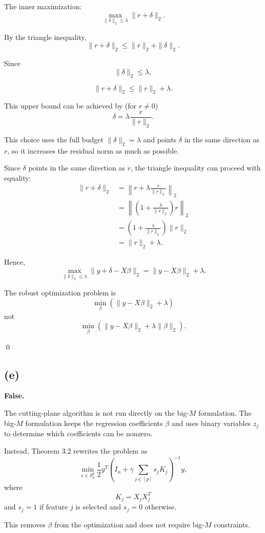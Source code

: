 \documentclass{article}
\begin{document}
The inner maximization: 
\[
\max_{\|\delta\|_2\leq\lambda}\|r+\delta\|_2.
\]

By the triangle inequality,
\[
\|r+\delta\|_2
\leq
\|r\|_2+\|\delta\|_2.
\]

Since
\[
\|\delta\|_2\leq\lambda,
\]

\[
\|r+\delta\|_2
\leq
\|r\|_2+\lambda.
\]

This upper bound can be achieved by (for $r\neq 0$)
\[
\delta
=
\lambda\frac{r}{\|r\|_2}.
\]

This choice uses the full budget $\|\delta\|_2=\lambda$ and points $\delta$ in the same direction as $r$, so it increases the residual norm as much as possible.

Since $\delta$ points in the same direction as $r$, the triangle
inequality can proceed with equality: 
\[
\begin{aligned}
\|r+\delta\|_2
&=
\left\|
r+\lambda\frac{r}{\|r\|_2}
\right\|_2 \\
&=
\left\|
\left(1+\frac{\lambda}{\|r\|_2}\right)r
\right\|_2 \\
&=
\left(1+\frac{\lambda}{\|r\|_2}\right)\|r\|_2 \\
&=
\|r\|_2+\lambda.
\end{aligned}
\]


Hence,
\[
\max_{\|\delta\|_2\leq\lambda}
\|y+\delta-X\beta\|_2
=
\|y-X\beta\|_2+\lambda.
\]

The robust optimization problem is
\[
\boxed{
\min_\beta
\left(
\|y-X\beta\|_2+\lambda
\right)}
\]
not
\[
\min_\beta
\left(
\|y-X\beta\|_2+\lambda\|\beta\|_2
\right).
\]

\qed



\subsection*{(e)}
\textbf{False.}

The cutting-plane algorithm is not run directly on the big-$M$
formulation. The big-$M$ formulation keeps the regression coefficients
$\beta$ and uses binary variables $z_j$ to determine which coefficients
can be nonzero.

Instead, Theorem 3.2 rewrites the problem as
\[
\min_{s\in S_k^p}
\frac{1}{2}y^T
\left(
I_n+\gamma\sum_{j\in[p]}s_jK_j
\right)^{-1}y,
\]
where
\[
K_j=X_jX_j^T
\]
and $s_j=1$ if feature $j$ is selected and $s_j=0$ otherwise. 

This
removes $\beta$ from the optimization and does not require big-$M$
constraints.
\end{document}
